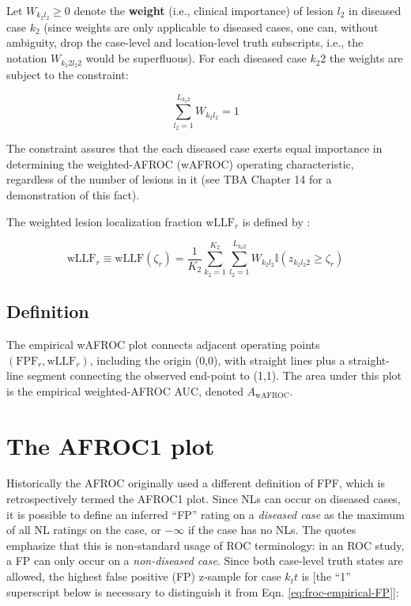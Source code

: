 \documentclass[
]{book}
\begin{document}
Let \(W_{k_2 l_2} \geq 0\) denote the \textbf{weight} (i.e., clinical importance) of lesion \(l_2\) in diseased case \(k_2\) (since weights are only applicable to diseased cases, one can, without ambiguity, drop the case-level and location-level truth subscripts, i.e., the notation \(W_{k_2 2 l_2 2}\) would be superfluous). For each diseased case \(k_2 2\) the weights are subject to the constraint:

\begin{equation}
\sum_{l_2 =1 }^{L_{k_2 2}} W_{k_2 l_2} = 1
\label{eq:froc-empirical-weights-constraint}
\end{equation}

The constraint assures that the each diseased case exerts equal importance in determining the weighted-AFROC (wAFROC) operating characteristic, regardless of the number of lesions in it (see TBA Chapter 14 for a demonstration of this fact).

The weighted lesion localization fraction \(\text{wLLF}_r\) is defined by \citep{RN2484}:

\begin{equation}
\text{wLLF}_r \equiv \text{wLLF}\left ( \zeta_r \right ) = \frac{1}{K_2}\sum_{k_2=1}^{K_2}\sum_{l_2=1}^{L_{k_2 2}}W_{k_2 l_2} \mathbb{I}\left ( z_{k_2 l_2 2} \geq \zeta_r \right )
\label{eq:froc-empirical-wLLFr}
\end{equation}

\hypertarget{froc-empirical-definition-auc-wAFROC}{%
\subsection{Definition}\label{froc-empirical-definition-auc-wAFROC}}

The empirical wAFROC plot connects adjacent operating points \(\left ( \text{FPF}_r, \text{wLLF}_r \right )\), including the origin (0,0), with straight lines plus a straight-line segment connecting the observed end-point to (1,1). The area under this plot is the empirical weighted-AFROC AUC, denoted \(A_{\text{wAFROC}}\).

\hypertarget{froc-empirical-AFROC1}{%
\section{The AFROC1 plot}\label{froc-empirical-AFROC1}}

Historically the AFROC originally used a different definition of FPF, which is retrospectively termed the AFROC1 plot. Since NLs can occur on diseased cases, it is possible to define an inferred ``FP'' rating on a \emph{diseased case} as the maximum of all NL ratings on the case, or \(-\infty\) if the case has no NLs. The quotes emphasize that this is non-standard usage of ROC terminology: in an ROC study, a FP can only occur on a \emph{non-diseased case}. Since both case-level truth states are allowed, the highest false positive (FP) z-sample for case \(k_t t\) is {[}the ``1'' superscript below is necessary to distinguish it from Eqn. \eqref{eq:froc-empirical-FP}{]}:
\end{document}
